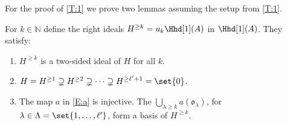 \documentclass[a4paper,11pt]{amsart}
\numberwithin{equation}{subsection}
\theoremstyle{definition}
\theoremstyle{theorem}
\theoremstyle{remark}
\newcommand\olam[1][\lambda]{\mathfrak{o}_{#1}}
\newcommand\N{\mathbb{N}}
\begin{document}
For the proof of \autoref{T:1} we prove two lemmas assuming the  setup from  \autoref{T:1}.

\begin{Lemma}\label{L:1}
  For $k\in\N$ define the right ideals $H^{\ge k}=u_k\Hhd[1](A)$ in $\Hhd[1](A)$.  They
  satisfy:
  \begin{enumerate}
    \item \label{H1} $H^{\ge k}$ is a two-sided ideal of $H$ for all $k$.
    \item \label{H2}  $H=H^{\ge1}\supsetneq H^{\ge2}\supsetneq\dots\supsetneq H^{\ge\ell'+1}=\set{0}$.
    \item  \label{H3} The map $a$ in \autoref{E:a} is injective. The
      $\bigcup_{\lambda\ge k}a(\olam)$, for $\lambda\in\Lambda=\set{1,\dots,\ell'}$,
      form a basis of $H^{\ge k}$.
  \end{enumerate}
\end{Lemma}
\end{document}
